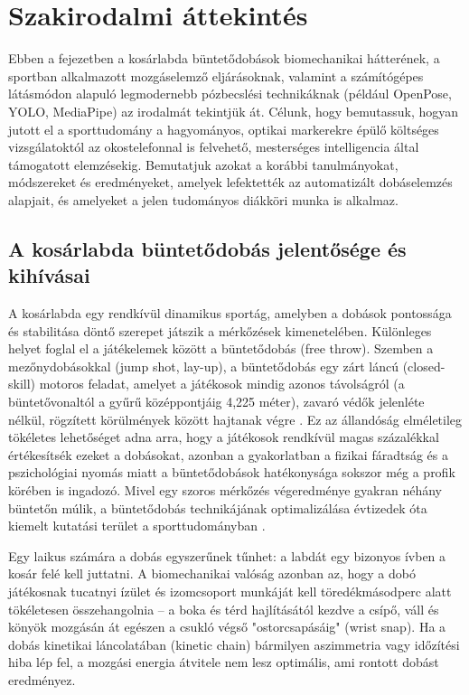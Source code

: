 \chapter{Szakirodalmi áttekintés}
\label{ch:szakirodalom}

Ebben a fejezetben a kosárlabda büntetődobások biomechanikai hátterének, a sportban alkalmazott mozgáselemző eljárásoknak, valamint a számítógépes látásmódon alapuló legmodernebb pózbecslési technikáknak (például OpenPose, YOLO, MediaPipe) az irodalmát tekintjük át. Célunk, hogy bemutassuk, hogyan jutott el a sporttudomány a hagyományos, optikai markerekre épülő költséges vizsgálatoktól az okostelefonnal is felvehető, mesterséges intelligencia által támogatott elemzésekig. Bemutatjuk azokat a korábbi tanulmányokat, módszereket és eredményeket, amelyek lefektették az automatizált dobáselemzés alapjait, és amelyeket a jelen tudományos diákköri munka is alkalmaz.

\section{A kosárlabda büntetődobás jelentősége és kihívásai}
A kosárlabda egy rendkívül dinamikus sportág, amelyben a dobások pontossága és stabilitása döntő szerepet játszik a mérkőzések kimenetelében. Különleges helyet foglal el a játékelemek között a büntetődobás (free throw). Szemben a mezőnydobásokkal (jump shot, lay-up), a büntetődobás egy zárt láncú (closed-skill) motoros feladat, amelyet a játékosok mindig azonos távolságról (a büntetővonaltól a gyűrű középpontjáig 4,225 méter), zavaró védők jelenléte nélkül, rögzített körülmények között hajtanak végre \cite{Gomez2015}. Ez az állandóság elméletileg tökéletes lehetőséget adna arra, hogy a játékosok rendkívül magas százalékkal értékesítsék ezeket a dobásokat, azonban a gyakorlatban a fizikai fáradtság és a pszichológiai nyomás miatt a büntetődobások hatékonysága sokszor még a profik körében is ingadozó. Mivel egy szoros mérkőzés végeredménye gyakran néhány büntetőn múlik, a büntetődobás technikájának optimalizálása évtizedek óta kiemelt kutatási terület a sporttudományban \cite{Hudson1985}. 

Egy laikus számára a dobás egyszerűnek tűnhet: a labdát egy bizonyos ívben a kosár felé kell juttatni. A biomechanikai valóság azonban az, hogy a dobó játékosnak tucatnyi ízület és izomcsoport munkáját kell töredékmásodperc alatt tökéletesen összehangolnia – a boka és térd hajlításától kezdve a csípő, váll és könyök mozgásán át egészen a csukló végső "ostorcsapásáig" (wrist snap). Ha a dobás kinetikai láncolatában (kinetic chain) bármilyen aszimmetria vagy időzítési hiba lép fel, a mozgási energia átvitele nem lesz optimális, ami rontott dobást eredményez.

